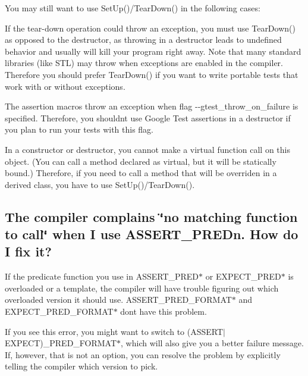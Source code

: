 You may still want to use {\ttfamily Set\+Up()/\+Tear\+Down()} in the following cases\+:
\begin{DoxyItemize}
\item If the tear-\/down operation could throw an exception, you must use {\ttfamily Tear\+Down()} as opposed to the destructor, as throwing in a destructor leads to undefined behavior and usually will kill your program right away. Note that many standard libraries (like S\+TL) may throw when exceptions are enabled in the compiler. Therefore you should prefer {\ttfamily Tear\+Down()} if you want to write portable tests that work with or without exceptions.
\item The assertion macros throw an exception when flag {\ttfamily -\/-\/gtest\+\_\+throw\+\_\+on\+\_\+failure} is specified. Therefore, you shouldn\textquotesingle{}t use Google Test assertions in a destructor if you plan to run your tests with this flag.
\item In a constructor or destructor, you cannot make a virtual function call on this object. (You can call a method declared as virtual, but it will be statically bound.) Therefore, if you need to call a method that will be overriden in a derived class, you have to use {\ttfamily Set\+Up()/\+Tear\+Down()}.
\end{DoxyItemize}

\subsection*{The compiler complains \char`\"{}no matching function to call\char`\"{} when I use A\+S\+S\+E\+R\+T\+\_\+\+P\+R\+E\+Dn. How do I fix it?}

If the predicate function you use in {\ttfamily A\+S\+S\+E\+R\+T\+\_\+\+P\+R\+E\+D$\ast$} or {\ttfamily E\+X\+P\+E\+C\+T\+\_\+\+P\+R\+E\+D$\ast$} is overloaded or a template, the compiler will have trouble figuring out which overloaded version it should use. {\ttfamily A\+S\+S\+E\+R\+T\+\_\+\+P\+R\+E\+D\+\_\+\+F\+O\+R\+M\+A\+T$\ast$} and {\ttfamily E\+X\+P\+E\+C\+T\+\_\+\+P\+R\+E\+D\+\_\+\+F\+O\+R\+M\+A\+T$\ast$} don\textquotesingle{}t have this problem.

If you see this error, you might want to switch to {\ttfamily (A\+S\+S\+E\+R\+T$\vert$\+E\+X\+P\+E\+CT)\+\_\+\+P\+R\+E\+D\+\_\+\+F\+O\+R\+M\+A\+T$\ast$}, which will also give you a better failure message. If, however, that is not an option, you can resolve the problem by explicitly telling the compiler which version to pick.

